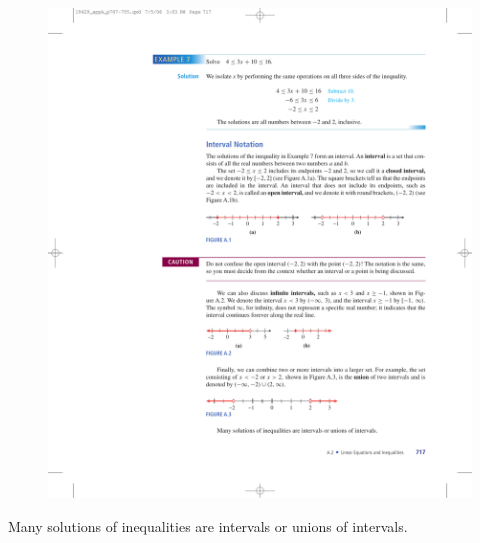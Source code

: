 \documentclass[10pt,]{book}
\theoremstyle{plain}
\theoremstyle{definition}
\theoremstyle{definition}
\theoremstyle{definition}
\numberwithin{equation}{part}
\begin{document}
\begin{figure}
\centering
\includegraphics[width=1\linewidth]{images/fig-numline-disjoint-infinite-intervals}
\caption{\label{fig-numline-disjoint-infinite-intervals}}
\end{figure}
%
\par
Many solutions of inequalities are intervals or unions of intervals.%
\end{document}
